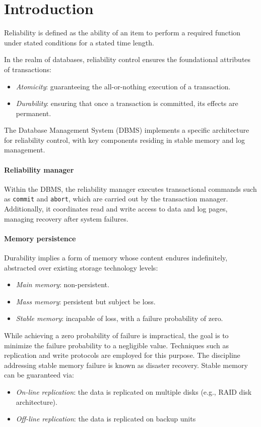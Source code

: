\section{Introduction}

\begin{definition}
    Reliability is defined as the ability of an item to perform a required function under stated conditions for a stated time length.
\end{definition}
In the realm of databases, reliability control ensures the foundational attributes of transactions:
\begin{itemize}
    \item \textit{Atomicity}: guaranteeing the all-or-nothing execution of a transaction.
    \item \textit{Durability}: ensuring that once a transaction is committed, its effects are permanent.
\end{itemize}
The Database Management System (DBMS) implements a specific architecture for reliability control, with key components residing in stable memory and log management.

\paragraph*{Reliability manager}
Within the DBMS, the reliability manager executes transactional commands such as \texttt{commit} and \texttt{abort}, which are carried out by the transaction manager. 
Additionally, it coordinates read and write access to data and log pages, managing recovery after system failures.

\paragraph*{Memory persistence}
Durability implies a form of memory whose content endures indefinitely, abstracted over existing storage technology levels:
\begin{itemize}
    \item \textit{Main memory}: non-persistent.
    \item \textit{Mass memory}: persistent but subject be loss.
    \item \textit{Stable memory}: incapable of loss, with a failure probability of zero.
\end{itemize}
While achieving a zero probability of failure is impractical, the goal is to minimize the failure probability to a negligible value. 
Techniques such as replication and write protocols are employed for this purpose. 
The discipline addressing stable memory failure is known as disaster recovery.
Stable memory can be guaranteed via:
\begin{itemize}
    \item \textit{On-line replication}: the data is replicated on multiple disks (e.g., RAID disk architecture).
    \item \textit{Off-line replication}: the data is replicated on backup units
\end{itemize}

